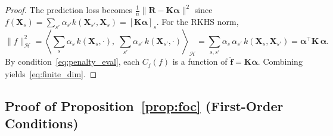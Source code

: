 \begin{proof}
The prediction loss becomes
$\frac{1}{n}\|\mathbf{R} - \mathbf{K}\boldsymbol{\alpha}\|^2$
since $f(\mathbf{X}_s) = \sum_{s'} \alpha_{s'} k(\mathbf{X}_{s'}, \mathbf{X}_s)
= [\mathbf{K}\boldsymbol{\alpha}]_s$.
For the RKHS norm,
\[
\|f\|_{\mathcal{H}}^2
= \left\langle \sum_s \alpha_s\, k(\mathbf{X}_s, \cdot),\;
         \sum_{s'} \alpha_{s'}\, k(\mathbf{X}_{s'}, \cdot) \right\rangle_{\mathcal{H}}
= \sum_{s,s'} \alpha_s\, \alpha_{s'}\, k(\mathbf{X}_s, \mathbf{X}_{s'})
= \boldsymbol{\alpha}^\top \mathbf{K}\, \boldsymbol{\alpha}.
\]
By condition~\eqref{eq:penalty_eval}, each $C_j(f)$ is a function of
$\hat{\mathbf{f}} = \mathbf{K}\boldsymbol{\alpha}$.
Combining yields~\eqref{eq:finite_dim}.
\end{proof}

\subsection{Proof of Proposition~\ref{prop:foc} (First-Order Conditions)}

